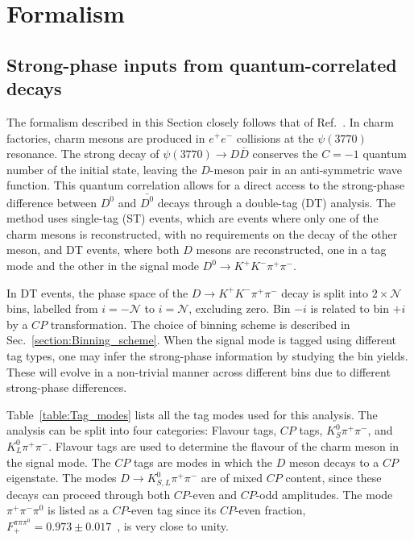 \documentclass[12pt, a4paper, notitlepage, onecolumn]{article}
\begin{document}
\section{Formalism}
\subsection{Strong-phase inputs from quantum-correlated \texorpdfstring{}{DD} decays}
\noindent The formalism described in this Section closely follows that of Ref.~\cite{HarnewS4pi}. In charm factories, charm mesons are produced in $e^+e^-$ collisions at the $\psi(3770)$ resonance. The strong decay of $\psi(3770)\to D\bar{D}$ conserves the $C = -1$ quantum number of the initial state, leaving the $D$-meson pair in an anti-symmetric wave function. This quantum correlation allows for a direct access to the strong-phase difference between $D^0$ and $\bar{D^0}$ decays through a double-tag (DT) analysis. The method uses single-tag (ST) events, which are events where only one of the charm mesons is reconstructed, with no requirements on the decay of the other meson, and DT events, where both $D$ mesons are reconstructed, one in a tag mode and the other in the signal mode $D^0\to K^+K^-\pi^+\pi^-$.

In DT events, the phase space of the $D\to K^+K^-\pi^+\pi^-$ decay is split into $2\times\mathcal{N}$ bins, labelled from $i = -\mathcal{N}$ to $i = \mathcal{N}$, excluding zero. Bin $-i$ is related to bin $+i$ by a $C\!P$ transformation. The choice of binning scheme is described in Sec.~\ref{section:Binning_scheme}. When the signal mode is tagged using different tag types, one may infer the strong-phase information by studying the bin yields. These will evolve in a non-trivial manner across different bins due to different strong-phase differences.

Table~\ref{table:Tag_modes} lists all the tag modes used for this analysis. The analysis can be split into four categories: Flavour tags, $C\!P$ tags, $K_S^0\pi^+\pi^-$, and $K_L^0\pi^+\pi^-$. Flavour tags are used to determine the flavour of the charm meson in the signal mode. The $C\!P$ tags are modes in which the $D$ meson decays to a $C\!P$ eigenstate. The modes $D\to K_{S, L}^0\pi^+\pi^-$ are of mixed $C\!P$ content, since these decays can proceed through both $C\!P$-even and $C\!P$-odd amplitudes. The mode $\pi^+\pi^-\pi^0$ is listed as a $C\!P$-even tag since its $C\!P$-even fraction, $F_+^{\pi\pi\pi^0} = 0.973 \pm 0.017$~\cite{cite:pipipi0_CPfraction}, is very close to unity.
\end{document}
